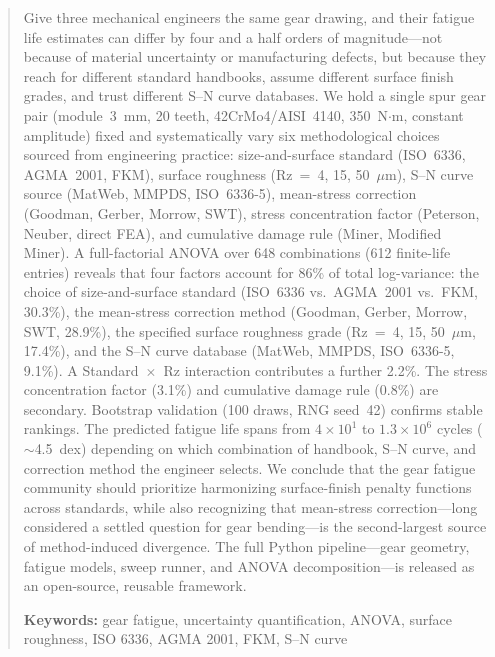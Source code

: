 \documentclass[12pt,a4paper]{article}
\begin{document}
\begin{abstract}
\label{sec:abstract}

Give three mechanical engineers the same gear drawing, and their fatigue
life estimates can differ by four and a half orders of magnitude---not because of
material uncertainty or manufacturing defects, but because they reach for
different standard handbooks, assume different surface finish grades, and
trust different S--N curve databases. We hold a single spur gear pair
(module~3~mm, 20 teeth, 42CrMo4/AISI~4140, 350~N$\cdot$m, constant
amplitude) fixed and systematically vary six methodological choices
sourced from engineering practice: size-and-surface standard (ISO~6336,
AGMA~2001, FKM), surface roughness (Rz~=~4, 15, 50~$\mu$m), S--N curve
source (MatWeb, MMPDS, ISO~6336-5), mean-stress correction (Goodman,
Gerber, Morrow, SWT), stress concentration factor (Peterson, Neuber,
direct FEA), and cumulative damage rule (Miner, Modified Miner). A
full-factorial ANOVA over 648 combinations (612 finite-life entries) reveals
that four factors account for 86\% of total log-variance: the choice of
size-and-surface standard (ISO~6336 vs.\ AGMA~2001 vs.\ FKM, 30.3\%), the
mean-stress correction method (Goodman, Gerber, Morrow, SWT, 28.9\%), the
specified surface roughness grade (Rz~=~4, 15, 50~$\mu$m, 17.4\%), and the
S--N curve database (MatWeb, MMPDS, ISO~6336-5, 9.1\%). A Standard~$\times$~Rz
interaction contributes a further 2.2\%. The stress concentration factor (3.1\%)
and cumulative damage rule (0.8\%) are secondary. Bootstrap validation (100 draws,
RNG seed~42) confirms stable rankings. The predicted fatigue life spans from
$4\times10^1$ to $1.3\times10^6$ cycles ($\sim$4.5~dex) depending on which
combination of handbook, S--N curve, and correction method the engineer selects.
We conclude that the gear fatigue community should prioritize harmonizing
surface-finish penalty functions across standards, while also recognizing that
mean-stress correction---long considered a settled question for gear bending---is
the second-largest source of method-induced divergence. The full
Python pipeline---gear geometry, fatigue models, sweep runner, and
ANOVA decomposition---is released as an open-source, reusable
framework.

\textbf{Keywords:} gear fatigue, uncertainty quantification, ANOVA,
surface roughness, ISO 6336, AGMA 2001, FKM, S--N curve

\end{abstract}
\end{document}

